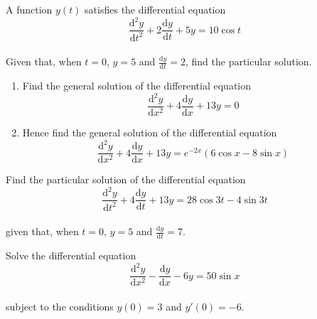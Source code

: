 \documentclass[leqno]{article}
\begin{document}
\begin{enumerate}[
  label=\textbf{\arabic*.},
  leftmargin=*,
  topsep=0pt,
  partopsep=0pt,
  parsep=0pt
]
\newpage

\questionitem

A function $y(t)$ satisfies the differential equation \\
\[
\frac{\mathrm{d}^2 y}{\mathrm{d}t^2}+2\frac{\mathrm{d}y}{\mathrm{d}t}+5y=10\cos t
\] \\
Given that, when $t=0$, $y=5$ and $\frac{\mathrm{d}y}{\mathrm{d}t}=2$, find the particular solution. 

\newpage

\questionitem

\begin{enumerate}[label=\textbf{(\alph*)}]
  \item Find the general solution of the differential equation
  \[
  \frac{\mathrm{d}^2 y}{\mathrm{d}x^2}+4\frac{\mathrm{d}y}{\mathrm{d}x}+13y=0
  \]
  \item Hence find the general solution of the differential equation
  \[
  \frac{\mathrm{d}^2 y}{\mathrm{d}x^2}+4\frac{\mathrm{d}y}{\mathrm{d}x}+13y=e^{-2x}(6\cos x-8\sin x)
  \]
\end{enumerate}

\newpage

\questionitem

Find the particular solution of the differential equation\\

\[
\frac{\mathrm{d}^2 y}{\mathrm{d}t^2}+4\frac{\mathrm{d}y}{\mathrm{d}t}+13y=28\cos 3t-4\sin 3t
\]\\
given that, when $t=0$, $y=5$ and $\frac{\mathrm{d}y}{\mathrm{d}t}=7$.  \\

\newpage

\questionitem

Solve the differential equation \\
\[
\frac{\mathrm{d}^2 y}{\mathrm{d}x^2}-\frac{\mathrm{d}y}{\mathrm{d}x}-6y=50\sin x
\] \\
subject to the conditions $y(0)=3$ and $y'(0)=-6$. 

\newpage

\questionitem


\end{enumerate}
\end{document}
